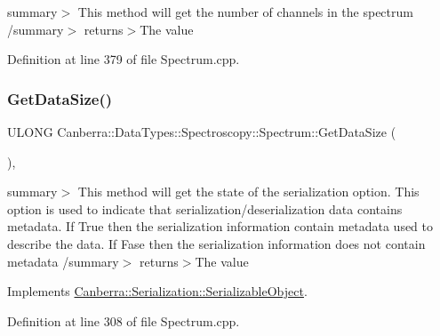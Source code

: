summary$>$ This method will get the number of channels in the spectrum /summary$>$ returns$>$The value

Definition at line 379 of file Spectrum.\+cpp.

\mbox{\label{class_canberra_1_1_data_types_1_1_spectroscopy_1_1_spectrum_a9dcde157042c3229d5d2e14e71cde914_a9dcde157042c3229d5d2e14e71cde914}} 
\subsubsection{\texorpdfstring{Get\+Data\+Size()}{GetDataSize()}}
{\footnotesize\ttfamily U\+L\+O\+NG Canberra\+::\+Data\+Types\+::\+Spectroscopy\+::\+Spectrum\+::\+Get\+Data\+Size (\begin{DoxyParamCaption}{ }\end{DoxyParamCaption})\hspace{0.3cm}{\ttfamily [protected]}, {\ttfamily [virtual]}}

summary$>$ This method will get the state of the serialization option. This option is used to indicate that serialization/deserialization data contains metadata. If True then the serialization information contain metadata used to describe the data. If Fase then the serialization information does not contain metadata /summary$>$ returns$>$The value

Implements \hyperlink{class_canberra_1_1_serialization_1_1_serializable_object}{Canberra\+::\+Serialization\+::\+Serializable\+Object}.



Definition at line 308 of file Spectrum.\+cpp.

\mbox{\label{class_canberra_1_1_data_types_1_1_spectroscopy_1_1_spectrum_aad961998d44cb34abbcdd78371035da6_aad961998d44cb34abbcdd78371035da6}} 
